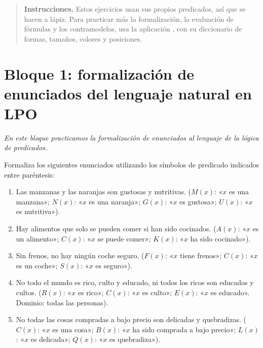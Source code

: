 \begin{quote}
\small \textbf{Instrucciones.} Estos ejercicios usan sus propios predicados, así que se hacen a lápiz. Para practicar más la formalización, la evaluación de fórmulas y los contramodelos, usa la aplicación \appmundo{}, con su diccionario de formas, tamaños, colores y posiciones.
\end{quote}

\section*{Bloque 1: formalización de enunciados del lenguaje natural en LPO}
\textit{En este bloque practicamos la formalización de enunciados al
  lenguaje de la lógica de predicados.}

\begin{pregunta}\label{e5-1}
Formaliza los siguientes enunciados utilizando los símbolos de predicado indicados entre paréntesis:
\begin{enumerate}
    \item Las manzanas y las naranjas son gustosas y nutritivas.  
    ($M(x)$: «$x$ es una manzana»; $N(x)$: «$x$ es una naranja»; $G(x)$: «$x$ es gustosa»; $U(x)$: «$x$ es nutritiva»).
    \item Hay alimentos que solo se pueden comer si han sido cocinados.  
    ($A(x)$: «$x$ es un alimento»; $C(x)$: «$x$ se puede comer»; $K(x)$: «$x$ ha sido cocinado»).
    \item Sin frenos, no hay ningún coche seguro.  
    ($F(x)$: «$x$ tiene frenos»; $C(x)$: «$x$ es un coche»; $S(x)$: «$x$ es seguro»).
    \item No todo el mundo es rico, culto y educado, ni todos los ricos son educados y cultos.  
    ($R(x)$: «$x$ es rico»; $C(x)$: «$x$ es culto»; $E(x)$: «$x$ es educado». Dominio: todas las personas).
    \item No todas las cosas compradas a bajo precio son delicadas y quebradizas.  
    ($C(x)$: «$x$ es una cosa»; $B(x)$: «$x$ ha sido comprada a bajo precio»; $L(x)$: «$x$ es delicada»; $Q(x)$: «$x$ es quebradiza»).
\end{enumerate}
\end{pregunta}

